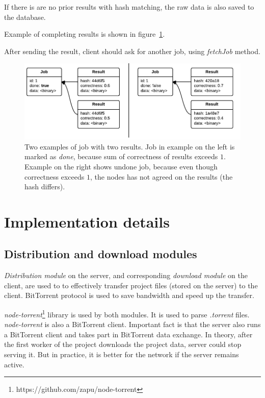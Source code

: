 If there is are no prior results with hash matching, the raw data is also saved to the database.

Example of completing results is shown in figure~\ref{f:sendresultsex}.

After sending the result, client should ask for another job, using \emph{fetchJob} method.

\begin{figure}
\centering
\includegraphics{diagrams/SendResultsExample.pdf}
\caption{Two examples of job with two results. Job in example on the left is marked as \emph{done}, because sum of correctness of results exceeds $1$. Example on the right shows undone job, because even though correctness exceeds $1$, the nodes has not agreed on the results (the hash differs).}
\label{f:sendresultsex}
\end{figure}

\section{Implementation details}
\label{s:impldet}

\subsection{Distribution and download modules}

\emph{Distribution module} on the server, and corresponding \emph{download module} on the client, are used to to effectively transfer project files (stored on the server) to the client. BitTorrent protocol is used to save bandwidth and speed up the transfer.

\emph{node-torrent}\footnote{https://github.com/zapu/node-torrent} library is used by both modules. It is used to parse \emph{.torrent} files. \emph{node-torrent} is also a BitTorrent client. Important fact is that the server also runs a BitTorrent client and takes part in BitTorrent data exchange. In theory, after the first worker of the project downloads the project data, server could stop serving it. But in practice, it is better for the network if the server remains active.

